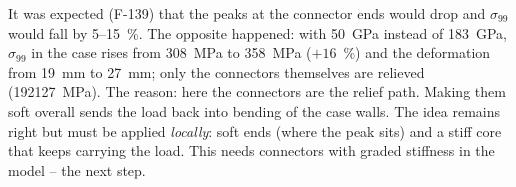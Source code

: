 It was expected (F-139) that the peaks at the connector ends would drop and $\sigma_{99}$ would fall by 5--15~\%. The
opposite happened: with \SI{50}{GPa} instead of \SI{183}{GPa}, $\sigma_{99}$ in the case rises from \SI{308}{MPa} to
\SI{358}{MPa} ($+16$~\%) and the deformation from \SI{19}{mm} to \SI{27}{mm}; only the connectors themselves are
relieved (\SI{192}{\to}\SI{127}{MPa}). The reason: here the connectors are the relief path. Making them soft overall
sends the load back into bending of the case walls. The idea remains right but must be applied \emph{locally}: soft
ends (where the peak sits) and a stiff core that keeps carrying the load. This needs connectors with graded stiffness in
the model -- the next step.
